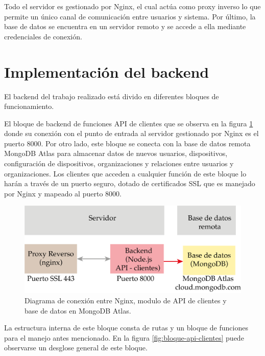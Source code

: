 Todo el servidor es gestionado por Nginx, el cual actúa como proxy inverso lo que permite un único canal de comunicación entre usuarios y sistema.  Por último, la base de datos se encuentra en un servidor remoto y se accede a ella mediante credenciales de conexión. 
 
 
\section{Implementación del backend}
\label{backend-sec}
El backend del trabajo realizado está divido en diferentes bloques de funcionamiento. 

El bloque de backend de funciones API de clientes que se observa en la figura \ref{fig:backend-clientes} donde su conexión con el punto de entrada al servidor gestionado por Nginx es el puerto 8000.  Por otro lado, este bloque se conecta con la base de datos remota MongoDB Atlas \citep{WEBSITE:35} para almacenar datos de nuevos usuarios, dispositivos, configuración de dispositivos, organizaciones y relaciones entre usuarios y organizaciones.  Los clientes que acceden a cualquier función de este bloque lo harán a través de un puerto seguro, dotado de certificados SSL que es manejado por Nginx y mapeado al puerto 8000.

\begin{figure}[htpb]
	\centering
	\includegraphics[scale=.75]{./Figures/backend-clientes.png}
	\caption[Conexión entre Nginx - API clientes y base de datos]{Diagrama de conexión entre Nginx, modulo de API de clientes y base de datos en MongoDB Atlas.}
	\label{fig:backend-clientes}
\end{figure}

La estructura interna de este bloque consta de rutas y un bloque de funciones para el manejo antes mencionado. En la figura \ref{fig:bloque-api-clientes} puede observarse un desglose general de este bloque. 


